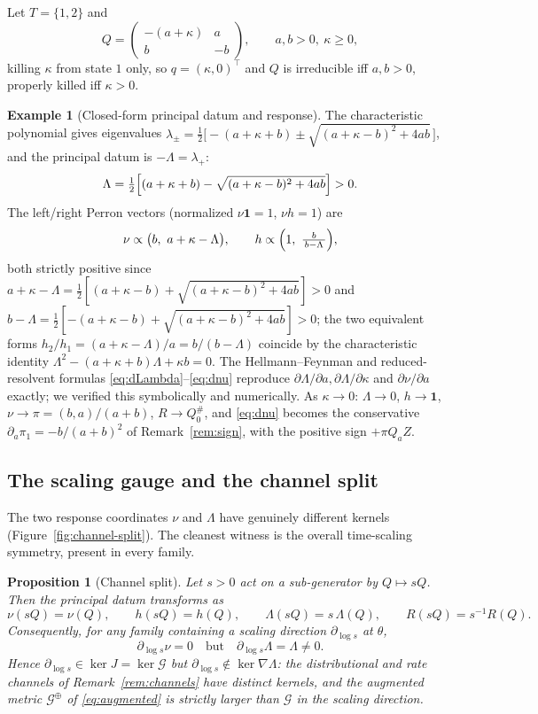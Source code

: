 \documentclass[11pt,reqno]{amsart}
\theoremstyle{plain}
\newtheorem{proposition}[theorem]{Proposition}
\theoremstyle{definition}
\newtheorem{example}[theorem]{Example}
\theoremstyle{remark}
\newcommand{\one}{\mathbf{1}}
\begin{document}
Let $T=\{1,2\}$ and
\[
Q=\begin{pmatrix}-(a+\kappa)&a\\ b&-b\end{pmatrix},
\qquad a,b>0,\ \kappa\ge0,
\]
killing $\kappa$ from state $1$ only, so $q=(\kappa,0)^{\top}$ and $Q$ is
irreducible iff $a,b>0$, properly killed iff $\kappa>0$.

\begin{example}[Closed-form principal datum and response]\label{ex:two-state}
The characteristic polynomial gives eigenvalues
$\lambda_{\pm}=\tfrac12\bigl[-(a+\kappa+b)\pm\sqrt{(a+\kappa-b)^{2}+4ab}\,\bigr]$,
and the principal datum is $-\Lambda=\lambda_{+}$:
\[
\Lambda=\tfrac12\Bigl[(a+\kappa+b)-\sqrt{(a+\kappa-b)^{2}+4ab}\Bigr]>0 .
\]
The left/right Perron vectors (normalized $\nu\one=1$, $\nu h=1$) are
\[
\nu\propto\bigl(b,\ a+\kappa-\Lambda\bigr),\qquad
h\propto\Bigl(1,\ \tfrac{b}{\,b-\Lambda\,}\Bigr),
\]
both strictly positive since $a+\kappa-\Lambda=\tfrac12[(a+\kappa-b)+\sqrt{(a+\kappa
-b)^2+4ab}]>0$ and $b-\Lambda=\tfrac12[-(a+\kappa-b)+\sqrt{(a+\kappa-b)^2+4ab}]>0$;
the two equivalent forms $h_2/h_1=(a+\kappa-\Lambda)/a=b/(b-\Lambda)$ coincide by
the characteristic identity $\Lambda^2-(a+\kappa+b)\Lambda+\kappa b=0$. The Hellmann--Feynman and reduced-resolvent
formulas \eqref{eq:dLambda}--\eqref{eq:dnu} reproduce $\partial\Lambda/\partial
a,\partial\Lambda/\partial\kappa$ and $\partial\nu/\partial a$ exactly; we verified
this symbolically and numerically. As $\kappa\to0$: $\Lambda\to0$, $h\to\one$,
$\nu\to\pi=(b,a)/(a+b)$, $R\to Q_0^{\#}$, and \eqref{eq:dnu} becomes the
conservative $\partial_a\pi_1=-b/(a+b)^2$ of Remark~\ref{rem:sign}, with the
positive sign $+\pi Q_aZ$.
\end{example}

\subsection{The scaling gauge and the channel split}

The two response coordinates $\nu$ and $\Lambda$ have genuinely different
kernels (Figure~\ref{fig:channel-split}). The cleanest witness is the overall
time-scaling symmetry, present in every family.

\begin{proposition}[Channel split]\label{prop:channel-split}
Let $s>0$ act on a sub-generator by $Q\mapsto sQ$. Then the principal datum
transforms as
\[
\nu(sQ)=\nu(Q),\qquad h(sQ)=h(Q),\qquad \Lambda(sQ)=s\,\Lambda(Q),\qquad R(sQ)=s^{-1}R(Q).
\]
Consequently, for any family containing a scaling direction
$\partial_{\log s}$ at $\theta$,
\[
\partial_{\log s}\nu=0
\quad\text{but}\quad
\partial_{\log s}\Lambda=\Lambda\neq0 .
\]
Hence $\partial_{\log s}\in\ker J=\ker\mathcal G$ but
$\partial_{\log s}\notin\ker\nabla\Lambda$: the distributional and rate channels of
Remark~\ref{rem:channels} have distinct kernels, and the augmented metric
$\mathcal G^{\oplus}$ of \eqref{eq:augmented} is strictly larger than $\mathcal G$
in the scaling direction.
\end{proposition}
\end{document}
